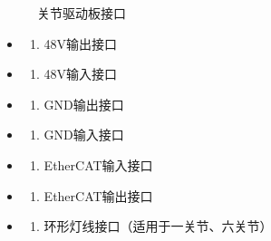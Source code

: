 \documentclass[a4paper,11pt,english,openany,oneside]{sphinxmanual}
\begin{document}
\begin{figure}[H]
\centering
\capstart

\noindent{}
\caption{关节驱动板接口}\label{\detokenize{_u66f4_u6362_u5173_u8282:id27}}\end{figure}
\begin{itemize}
\item {} \begin{enumerate}
%
\item {} 
\sphinxAtStartPar
48V输出接口

\end{enumerate}

\item {} \begin{enumerate}
%
\setcounter{enumi}{1}
\item {} 
\sphinxAtStartPar
48V输入接口

\end{enumerate}

\item {} \begin{enumerate}
%
\setcounter{enumi}{2}
\item {} 
\sphinxAtStartPar
GND输出接口

\end{enumerate}

\item {} \begin{enumerate}
%
\setcounter{enumi}{3}
\item {} 
\sphinxAtStartPar
GND输入接口

\end{enumerate}

\item {} \begin{enumerate}
%
\setcounter{enumi}{4}
\item {} 
\sphinxAtStartPar
EtherCAT输入接口

\end{enumerate}

\item {} \begin{enumerate}
%
\setcounter{enumi}{5}
\item {} 
\sphinxAtStartPar
EtherCAT输出接口

\end{enumerate}

\item {} \begin{enumerate}
%
\setcounter{enumi}{6}
\item {} 
\sphinxAtStartPar
环形灯线接口（适用于一关节、六关节）

\end{enumerate}

\end{itemize}
\end{document}
